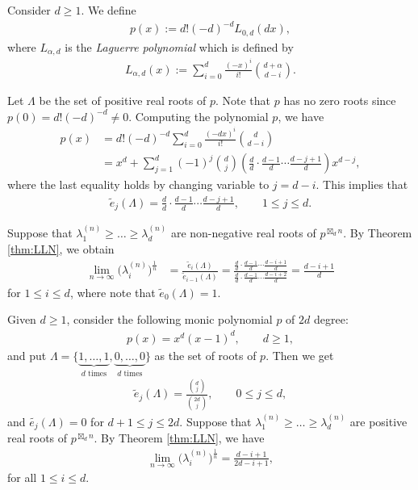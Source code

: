 \documentclass[pdftex]{sigma}
\numberwithin{equation}{section}
\begin{document}
\begin{Example}\label{ex:Laguerre}
Consider $d\ge 1$. We define
\begin{align*}
p(x):=d! (-d)^{-d} L_{0,d}(dx),
\end{align*}
where $L_{\alpha,d}$ is the {\it Laguerre polynomial} which is defined by
\begin{align*}
L_{\alpha,d}(x):=\sum_{i=0}^d \frac{(-x)^i}{i!} \binom{d+\alpha}{d-i}.
\end{align*}

Let $\Lambda$ be the set of positive real roots of $p$. Note that $p$ has no zero roots since $p(0)=d! (-d)^{-d} \neq 0$. Computing the polynomial $p$, we have
\begin{align*}
p(x) &=d! (-d)^{-d} \sum_{i=0}^d \frac{(-dx)^i}{i!} \binom{d}{d-i}\\
&=x^d+\sum_{j=1}^d (-1)^j \binom{d}{j} \left(\frac{d}{d}\cdot \frac{d-1}{d} \cdots \frac{d-j+1}{d} \right) x^{d-j},
\end{align*}
where the last equality holds by changing variable to $j=d-i$. This implies that
\begin{align*}
\widetilde{e}_j(\Lambda)=\frac{d}{d}\cdot \frac{d-1}{d} \cdots \frac{d-j+1}{d}, \qquad 1 \le j \le d.
\end{align*}

Suppose that $\lambda_{1}^{(n)}\ge \dots \ge \lambda_{d}^{(n)}$ are non-negative real roots of $p^{\boxtimes_d n}$. By Theorem \ref{thm:LLN}, we obtain
\begin{align*}
\lim_{n\rightarrow\infty}\big(\lambda_{i}^{(n)}\big)^{\frac{1}{n}} &= \frac{\widetilde{e}_i(\Lambda)}{\widetilde{e}_{i-1}(\Lambda)}=\frac{\frac{d}{d}\cdot \frac{d-1}{d} \cdots \frac{d-i+1}{d}}{\frac{d}{d}\cdot \frac{d-1}{d} \cdots \frac{d-i+2}{d}}=\frac{d-i+1}{d}
\end{align*}
for $1\le i \le d$, where note that $\tilde{e}_0(\Lambda)=1$.
\end{Example}

\begin{Example}\label{ex:two_root}
Given $d\ge 1$, consider the following monic polynomial $p$ of $2d$ degree:
\begin{align*}
p(x)=x^d(x-1)^d, \qquad d \ge1,
\end{align*}
and put $\Lambda=\{\underbrace{1,\dots, 1}_{d \text{ times}} , \underbrace{0, \dots, 0}_{d \text{ times}}\}$ as the set of roots of $p$. Then we get
\begin{align*}
\widetilde{e}_j(\Lambda)=\frac{\binom{d}{j}}{\binom{2d}{j}}, \qquad 0 \le j \le d,
\end{align*}
and $\tilde{e_j}(\Lambda)=0$ for $d+1\le j \le 2d$. Suppose that $\lambda_{1}^{(n)} \ge \dots \ge\lambda_{d}^{(n)}$ are positive real roots of $p^{\boxtimes_d n}$. By Theorem \ref{thm:LLN}, we have
\begin{align*}
\lim_{n\rightarrow\infty} \big(\lambda_{i}^{(n)}\big)^{\frac{1}{n}}=\frac{d-i+1}{2d-i+1},
\end{align*}
for all $1\le i \le d$.
\end{Example}
\end{document}
